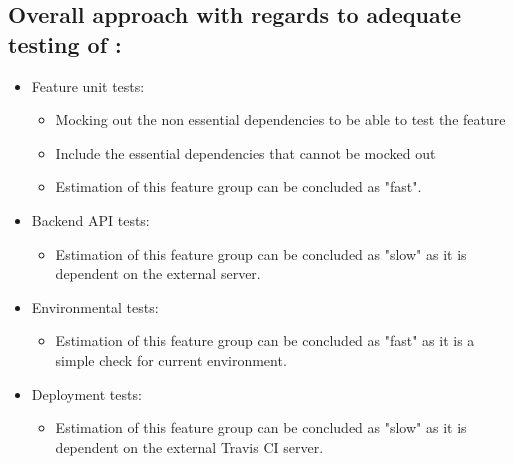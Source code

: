 \documentclass{article}
\begin{document}
\subsection{Overall approach with regards to adequate testing of :} 
\begin{itemize}
\item Feature unit tests:
\begin{itemize}
	\item Mocking out the non essential dependencies to be able to test the feature
	\item Include the essential dependencies that cannot be mocked out
	\item Estimation of this feature group can be concluded as "fast".
\end{itemize}
\item Backend API tests:
\begin{itemize}
	\item Estimation of this feature group can be concluded as "slow" as it is dependent on the external server.
\end{itemize}
\item Environmental tests:
\begin{itemize}
	\item Estimation of this feature group can be concluded as "fast" as it is a simple check for current environment.
\end{itemize}
\item Deployment tests:
\begin{itemize}
	\item Estimation of this feature group can be concluded as "slow" as it is dependent on the external Travis CI server.
\end{itemize}
\end{itemize}
\end{document}
